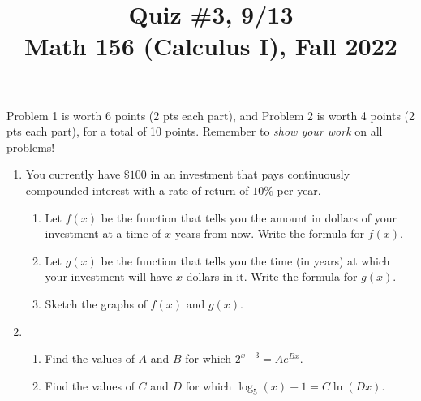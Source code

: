 \documentclass[11pt]{article}
\title{Quiz \#3, 9/13 \\ Math 156 (Calculus I), Fall 2022}
\date{}
\begin{document}
\maketitle

\thispagestyle{empty}

\vspace{-1cm}

Problem 1 is worth 6 points (2 pts each part), and Problem 2 is worth 4 points (2 pts each part), for a total of 10 points. Remember to \emph{show your work} on all problems!

\begin{enumerate}
\item You currently have $\$100$ in an investment that pays continuously compounded interest with a rate of return of $10\%$ per year.
\begin{enumerate}
\item Let $f(x)$ be the function that tells you the amount in dollars of your investment at a time of $x$ years from now. Write the formula for $f(x)$.
\item Let $g(x)$ be the function that tells you the time (in years) at which your investment will have $x$ dollars in it. Write the formula for $g(x)$.
\item Sketch the graphs of $f(x)$ and $g(x)$.
\end{enumerate}

\vspace{2.5in}

\item \begin{enumerate}
\item Find the values of $A$ and $B$ for which $2^{x-3}=A e^{Bx}$.
\item Find the values of $C$ and $D$ for which $\log_5(x) + 1 = C \ln (Dx)$.
\end{enumerate}
\end{enumerate}
\end{document}
